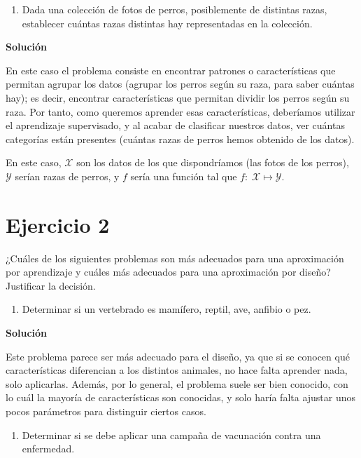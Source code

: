 \documentclass[11pt,a4paper]{article}
\newcommand{\answer}{\noindent\textbf{Solución}}
\begin{document}
\begin{enumerate}[resume,label=\textit{\alph*})]
	\item Dada una colección de fotos de perros, posiblemente de distintas razas, establecer
	cuántas razas distintas hay representadas en la colección.
\end{enumerate}

\answer

En este caso el problema consiste en encontrar patrones o características que permitan agrupar los datos (agrupar los perros
según su raza, para saber cuántas hay); es decir, encontrar características que permitan dividir los perros según su raza. Por
tanto, como queremos aprender esas características, deberíamos utilizar el aprendizaje supervisado, y al acabar de clasificar
nuestros datos, ver cuántas categorías están presentes (cuántas razas de perros hemos obtenido de los datos).

En este caso, $\mathcal{X}$ son los datos de los que dispondríamos (las fotos de los perros), $\mathcal{Y}$ serían
razas de perros, y $f$ sería una función tal que $f: \; \mathcal{X} \mapsto \mathcal{Y}$.

\section*{Ejercicio 2}

\noindent ¿Cuáles de los siguientes problemas son más adecuados para una aproximación por aprendizaje y cuáles más adecuados
para una aproximación por diseño? Justificar la decisión.

\begin{enumerate}[label=\textit{\alph*})]
	\item Determinar si un vertebrado es mamífero, reptil, ave, anfibio o pez.
\end{enumerate}

\answer

Este problema parece ser más adecuado para el diseño, ya que si se conocen qué características diferencian a los distintos
animales, no hace falta aprender nada, solo aplicarlas. Además, por lo general, el problema suele ser bien conocido, con lo
cuál la mayoría de características son conocidas, y solo haría falta ajustar unos pocos parámetros para distinguir ciertos
casos.

\begin{enumerate}[resume,label=\textit{\alph*})]
	\item Determinar si se debe aplicar una campaña de vacunación contra una enfermedad.
\end{enumerate}
\end{document}
